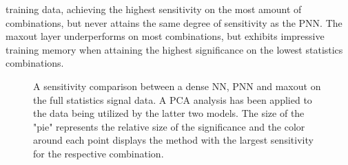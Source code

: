training data, achieving the highest sensitivity on the most amount of combinations, but never attains the same degree of sensitivity as the \ac{PNN}. The maxout layer underperforms on 
most combinations, but exhibits impressive training memory when attaining the highest significance on the lowest statistics combinations.
\begin{figure}
    \caption[A sensitivity comparison between a dense \ac{NN}, \ac{PNN} and maxout on the full statistics 
    signal data. A \ac{PCA} analysis has been applied to the data being utilized by the latter two models.]{
    A sensitivity comparison between a dense \ac{NN}, \ac{PNN} and maxout on the full statistics 
    signal data. A \ac{PCA} analysis has been applied to the data being utilized by the latter two models.
    The size of the "pie" represents the relative size of the significance and the color around each point 
    displays the method with the largest sensitivity for the respective combination.}
    \label{fig:FSComp}
\end{figure}